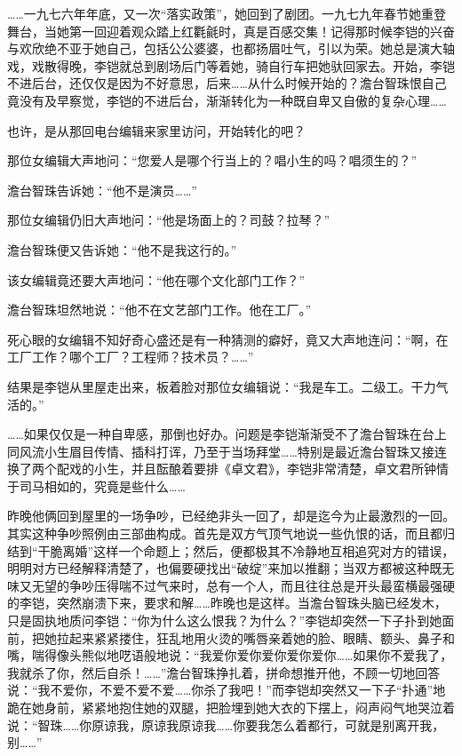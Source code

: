 \par ……一九七六年年底，又一次“落实政策”，她回到了剧团。一九七九年春节她重登舞台，当她第一回迎着观众踏上红氍毹时，真是百感交集！记得那时候李铠的兴奋与欢欣绝不亚于她自己，包括公公婆婆，也都扬眉吐气，引以为荣。她总是演大轴戏，戏散得晚，李铠就总到剧场后门等着她，骑自行车把她驮回家去。开始，李铠不进后台，还仅仅是因为不好意思，后来……从什么时候开始的？澹台智珠恨自己竟没有及早察觉，李铠的不进后台，渐渐转化为一种既自卑又自傲的复杂心理……
\par 也许，是从那回电台编辑来家里访问，开始转化的吧？
\par 那位女编辑大声地问：“您爱人是哪个行当上的？唱小生的吗？唱须生的？”
\par 澹台智珠告诉她：“他不是演员……”
\par 那位女编辑仍旧大声地问：“他是场面上的？司鼓？拉琴？”
\par 澹台智珠便又告诉她：“他不是我这行的。”
\par 该女编辑竟还要大声地问：“他在哪个文化部门工作？”
\par 澹台智珠坦然地说：“他不在文艺部门工作。他在工厂。”
\par 死心眼的女编辑不知好奇心盛还是有一种猜测的癖好，竟又大声地连问：“啊，在工厂工作？哪个工厂？工程师？技术员？……”
\par 结果是李铠从里屋走出来，板着脸对那位女编辑说：“我是车工。二级工。干力气活的。”
\par ……如果仅仅是一种自卑感，那倒也好办。问题是李铠渐渐受不了澹台智珠在台上同风流小生眉目传情、插科打诨，乃至于当场拜堂……特别是最近澹台智珠又接连换了两个配戏的小生，并且酝酿着要排《卓文君》，李铠非常清楚，卓文君所钟情于司马相如的，究竟是些什么……
\par 昨晚他俩回到屋里的一场争吵，已经绝非头一回了，却是迄今为止最激烈的一回。其实这种争吵照例由三部曲构成。首先是双方气顶气地说一些仇恨的话，而且都归结到“干脆离婚”这样一个命题上；然后，便都极其不冷静地互相追究对方的错误，明明对方已经解释清楚了，也偏要硬找出“破绽”来加以推翻；当双方都被这种既无味又无望的争吵压得喘不过气来时，总有一个人，而且往往总是开头最蛮横最强硬的李铠，突然崩溃下来，要求和解……昨晚也是这样。当澹台智珠头脑已经发木，只是固执地质问李铠：“你为什么这么恨我？为什么？”李铠却突然一下子扑到她面前，把她拉起来紧紧搂住，狂乱地用火烫的嘴唇亲着她的脸、眼睛、额头、鼻子和嘴，喘得像头熊似地呓语般地说：“我爱你爱你爱你爱你爱你……如果你不爱我了，我就杀了你，然后自杀！……”澹台智珠挣扎着，拼命想推开他，不顾一切地回答说：“我不爱你，不爱不爱不爱……你杀了我吧！”而李铠却突然又一下子“扑通”地跪在她身前，紧紧地抱住她的双腿，把脸埋到她大衣的下摆上，闷声闷气地哭泣着说：“智珠……你原谅我，原谅我原谅我……你要我怎么着都行，可就是别离开我，别……”
